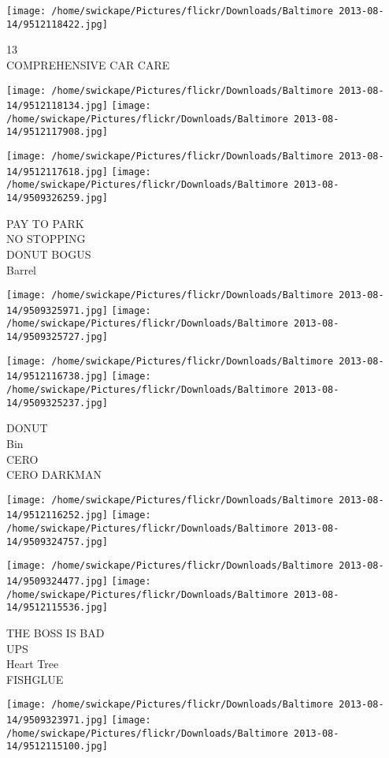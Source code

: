 \documentclass[10pt,letterpaper]{article}
\begin{document}
\vspace{0.25in}
\texttt{[image: /home/swickape/Pictures/flickr/Downloads/Baltimore 2013-08-14/9512118422.jpg]}

13\\
COMPREHENSIVE CAR CARE
\pagebreak

\texttt{[image: /home/swickape/Pictures/flickr/Downloads/Baltimore 2013-08-14/9512118134.jpg]}
\texttt{[image: /home/swickape/Pictures/flickr/Downloads/Baltimore 2013-08-14/9512117908.jpg]}

\texttt{[image: /home/swickape/Pictures/flickr/Downloads/Baltimore 2013-08-14/9512117618.jpg]}
\texttt{[image: /home/swickape/Pictures/flickr/Downloads/Baltimore 2013-08-14/9509326259.jpg]}

PAY TO PARK\\
NO STOPPING\\
DONUT BOGUS\\
Barrel
\pagebreak

\texttt{[image: /home/swickape/Pictures/flickr/Downloads/Baltimore 2013-08-14/9509325971.jpg]}
\texttt{[image: /home/swickape/Pictures/flickr/Downloads/Baltimore 2013-08-14/9509325727.jpg]}

\texttt{[image: /home/swickape/Pictures/flickr/Downloads/Baltimore 2013-08-14/9512116738.jpg]}
\texttt{[image: /home/swickape/Pictures/flickr/Downloads/Baltimore 2013-08-14/9509325237.jpg]}

DONUT\\
Bin\\
CERO\\
CERO DARKMAN
\pagebreak

\texttt{[image: /home/swickape/Pictures/flickr/Downloads/Baltimore 2013-08-14/9512116252.jpg]}
\texttt{[image: /home/swickape/Pictures/flickr/Downloads/Baltimore 2013-08-14/9509324757.jpg]}

\texttt{[image: /home/swickape/Pictures/flickr/Downloads/Baltimore 2013-08-14/9509324477.jpg]}
\texttt{[image: /home/swickape/Pictures/flickr/Downloads/Baltimore 2013-08-14/9512115536.jpg]}

THE BOSS IS BAD\\
UPS\\
Heart Tree\\
FISHGLUE
\pagebreak

\texttt{[image: /home/swickape/Pictures/flickr/Downloads/Baltimore 2013-08-14/9509323971.jpg]}
\texttt{[image: /home/swickape/Pictures/flickr/Downloads/Baltimore 2013-08-14/9512115100.jpg]}
\end{document}
